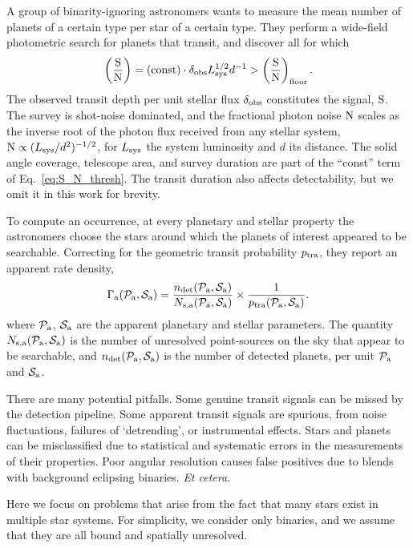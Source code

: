 \documentclass[12pt,modern]{aastex61}
\newcommand{\pp}{\mathcal{P}}
\newcommand{\ps}{\mathcal{S}}
\renewcommand{\a}{_{\rm a}}
\begin{document}
A group of binarity-ignoring astronomers wants to measure the mean number of 
planets of a certain type per star of a certain type.
They perform a wide-field photometric search for planets that transit, and 
discover all for which
\begin{equation}
\left(\frac{{\rm S}}{{\rm N}}\right)
= ({\rm const}) \cdot \delta_{\rm obs} L_{\rm sys}^{1/2} d^{-1}
> \left(\frac{{\rm S}}{{\rm N}}\right)_{\rm floor}.
\label{eq:S_N_thresh}
\end{equation}
The observed transit depth per unit stellar flux $\delta_{\rm obs}$ 
constitutes the signal, ${\rm S}$.
The survey is shot-noise dominated, and the fractional photon noise 
${\rm N}$ scales as the inverse root of the photon flux received from any 
stellar system, ${\rm N} \propto (L_{\rm sys}/d^2)^{-1/2}$, for $L_{\rm sys}$ 
the system luminosity and $d$ its distance.
The solid angle coverage, telescope area, and survey duration are part of the 
``const'' term of Eq.~\ref{eq:S_N_thresh}. The transit duration also 
affects detectability, but we omit it in this work for brevity.

To compute an occurrence, at every planetary and stellar property the 
astronomers choose the stars around which the planets of interest appeared to 
be searchable.
Correcting for the geometric transit probability $p_{\rm tra}$, they report an 
apparent rate density,
\begin{equation}
\Gamma\a(\pp\a, \ps\a) = \frac{n_{\rm det}(\pp\a, \ps\a)}{N_{\rm s,a}(\pp\a, 
    \ps\a)} \times \frac{1}{p_{\rm tra}(\pp\a, \ps\a)}.
\label{eq:defn_apparent_rate_density}
\end{equation}
where $\pp\a$, $\ps\a$ are the apparent planetary and stellar parameters.
The quantity $N_{\rm s,a}(\pp\a, \ps\a)$ is the number of unresolved 
point-sources on the sky that appear to be searchable, and
$n_{\rm det}(\pp\a, \ps\a)$ is the number of detected planets, per unit 
$\pp\a$ and $\ps\a$. 

There are many potential pitfalls.  Some genuine transit signals can be missed
by the detection pipeline.  Some apparent transit signals are spurious, from
noise fluctuations, failures of `detrending', or instrumental effects.  Stars
and planets can be misclassified due to statistical and systematic errors in
the measurements of their properties.  Poor angular resolution causes false
positives due to blends with background eclipsing binaries. {\it Et cetera}.

Here we focus on problems that arise from the fact that many stars exist in 
multiple star systems.
For simplicity, we consider only binaries, and we assume that they are all 
bound and spatially unresolved.
\end{document}
